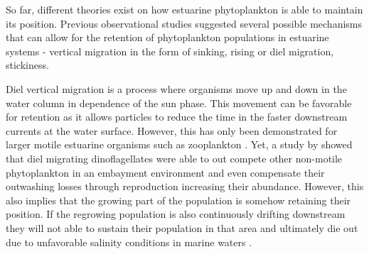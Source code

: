 \documentclass[npg, manuscript]{copernicus}
\begin{document}

So far, different theories exist on how estuarine phytoplankton is able to maintain its position. Previous observational studies suggested several possible mechanisms that can allow for the retention of phytoplankton populations in estuarine systems - vertical migration in the form of sinking,  rising or diel migration, stickiness.

Diel vertical migration is a process where organisms move up and down in the water column in dependence of the sun phase.
This movement can be favorable for retention as it allows particles to reduce the time in the faster downstream currents at the water surface.
However, this has only been demonstrated for larger motile estuarine organisms such as zooplankton \citep{Hall2015, Kimmerer2002, Crawford1991,Hall2011}.
Yet, a study by \citep{Anderson1985} showed that diel migrating dinoflagellates were able to out compete other non-motile phytoplankton in an embayment environment and even compensate their outwashing losses through reproduction increasing their abundance.
However, this also implies that the growing part of the population is somehow retaining their position.
If the regrowing population is also continuously drifting downstream they will not able to sustain their population in that area and ultimately die out due to unfavorable salinity conditions in marine waters \citep{Admiraal1976, vonAlvensleben2016, Jiang2020}.
\end{document}
